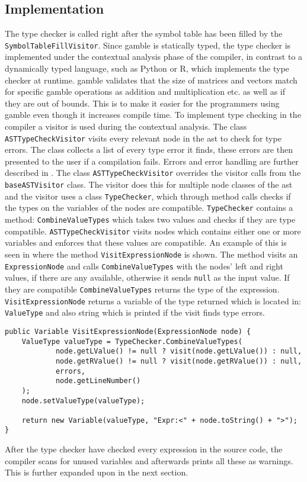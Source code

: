 \subsection*{Implementation}
The type checker is called right after the symbol table has been filled by the \texttt{SymbolTableFillVisitor}.
Since \gls{gamble} is statically typed, the type checker is implemented under the contextual analysis phase of the compiler, in contrast to a dynamically typed language, such as Python or R, which implements the type checker at runtime. 
\gls{gamble} validates that the size of matrices and vectors match for specific \gls{gamble} operations as addition and multiplication etc. as well as if they are out of bounds. 
This is to make it easier for the programmers using \gls{gamble} even though it increases compile time. 
To implement type checking in the compiler a visitor is used during the contextual analysis.
The class \texttt{ASTTypeCheckVisitor} visits every relevant node in the \acrshort{ast} to check for type errors.
The class collects a list of every type error it finds, these errors are then presented to the user if a compilation fails.
Errors and error handling are further described in .
The class \texttt{ASTTypeCheckVisitor} overrides the visitor calls from the \texttt{baseASTVisitor} class.
The visitor does this for multiple node classes of the \acrshort{ast} and the visitor uses a class \texttt{TypeChecker}, which through method calls checks if the types on the variables of the nodes are compatible.
\texttt{TypeChecker} contains a method: \texttt{CombineValueTypes} which takes two values and checks if they are type compatible.
\texttt{ASTTypeCheckVisitor} visits nodes which contains either one or more variables and enforces that these values are compatible.
An example of this is seen in  where the method \texttt{VisitExpressionNode} is shown.
The method visits an \texttt{ExpressionNode} and calls \texttt{CombineValueTypes} with the nodes' left and right values, if there are any available, otherwise it sends \texttt{null} as the input value.
If they are compatible \texttt{CombineValueTypes} returns the type of the expression.
\texttt{VisitExpressionNode} returns a variable of the type returned which is located in: \texttt{ValueType} and also string which is printed if the visit finds type errors.

\begin{lstlisting}[caption=The VisitExprressionNode method in the ASTTypeChecker class,numbers=none,frame=tlrb,label={lst:typecheck1}]
public Variable VisitExpressionNode(ExpressionNode node) {
    ValueType valueType = TypeChecker.CombineValueTypes(
            node.getLValue() != null ? visit(node.getLValue()) : null,
            node.getRValue() != null ? visit(node.getRValue()) : null,
            errors,
            node.getLineNumber()
    );
    node.setValueType(valueType);

    return new Variable(valueType, "Expr:<" + node.toString() + ">");
}
\end{lstlisting}

After the type checker have checked every expression in the source code, the compiler scans for unused variables and afterwards prints all these as warnings.
This is further expanded upon in the next section.